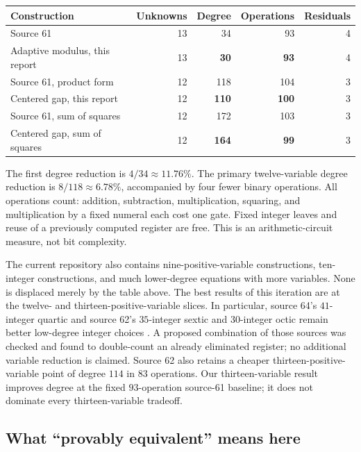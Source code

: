 \documentclass[11pt]{article}
\theoremstyle{remark}
\begin{document}
\begin{center}\small
\begin{tabular}{@{}lrrrr@{}}
\toprule
Construction & Unknowns & Degree & Operations & Residuals\\
\midrule
Source 61 & 13 & 34 & 93 & 4\\
Adaptive modulus, this report & 13 & \textbf{30} & \textbf{93} & 4\\
Source 61, product form & 12 & 118 & 104 & 3\\
Centered gap, this report & 12 & \textbf{110} & \textbf{100} & 3\\
Source 61, sum of squares & 12 & 172 & 103 & 3\\
Centered gap, sum of squares & 12 & \textbf{164} & \textbf{99} & 3\\
\bottomrule
\end{tabular}
\end{center}

The first degree reduction is $4/34\approx11.76\%$. The primary twelve-variable
degree reduction is $8/118\approx6.78\%$, accompanied by four fewer binary
operations. All operations count: addition, subtraction, multiplication,
squaring, and multiplication by a fixed numeral each cost one gate. Fixed
integer leaves and reuse of a previously computed register are free. This is
an arithmetic-circuit measure, not bit complexity.

The current repository also contains nine-positive-variable constructions,
ten-integer constructions, and much lower-degree equations with more
variables. None is displaced merely by the table above. The best results of
this iteration are at the twelve- and thirteen-positive-variable slices.
In particular, source 64's $41$-integer quartic and source 62's $35$-integer
sextic and $30$-integer octic remain better low-degree integer choices
\cite{source62,source64}. A proposed combination of those sources was checked
and found to double-count an already eliminated register; no additional
variable reduction is claimed.
Source 62 also retains a cheaper thirteen-positive-variable point of degree
$114$ in $83$ operations. Our thirteen-variable result improves degree at
the fixed $93$-operation source-61 baseline; it does not dominate every
thirteen-variable tradeoff.

\subsection{What ``provably equivalent'' means here}
\end{document}
